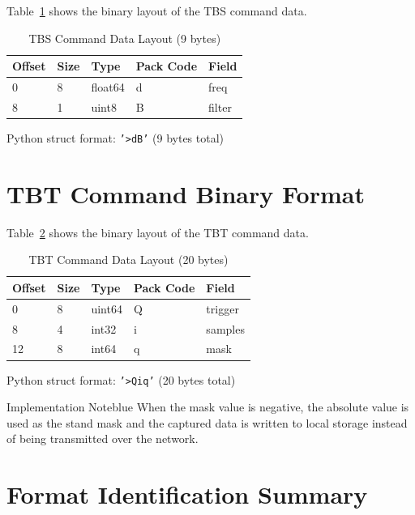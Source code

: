 Table~\ref{tab:tbs-cmd-layout} shows the binary layout of the TBS command data.

\begin{table}[htbp]
    \centering
    \caption{TBS Command Data Layout (9 bytes)}
    \label{tab:tbs-cmd-layout}
    \begin{tabular}{lllll}
        \toprule
        \textbf{Offset} & \textbf{Size} & \textbf{Type} & \textbf{Pack Code} & \textbf{Field} \\
        \midrule
        0 & 8 & float64 & d & freq \\
        8 & 1 & uint8 & B & filter \\
        \bottomrule
    \end{tabular}
\end{table}

Python struct format: \texttt{'>dB'} (9 bytes total)

\section{TBT Command Binary Format}

Table~\ref{tab:tbt-cmd-layout} shows the binary layout of the TBT command data.

\begin{table}[htbp]
    \centering
    \caption{TBT Command Data Layout (20 bytes)}
    \label{tab:tbt-cmd-layout}
    \begin{tabular}{lllll}
        \toprule
        \textbf{Offset} & \textbf{Size} & \textbf{Type} & \textbf{Pack Code} & \textbf{Field} \\
        \midrule
        0 & 8 & uint64 & Q & trigger \\
        8 & 4 & int32 & i & samples \\
        12 & 8 & int64 & q & mask \\
        \bottomrule
    \end{tabular}
\end{table}

Python struct format: \texttt{'>Qiq'} (20 bytes total)

\begin{calloutBox}{Implementation Note}{blue}
When the mask value is negative, the absolute value is used as the stand mask and the captured data is written to local storage instead of being transmitted over the network.
\end{calloutBox}

\section{Format Identification Summary}

